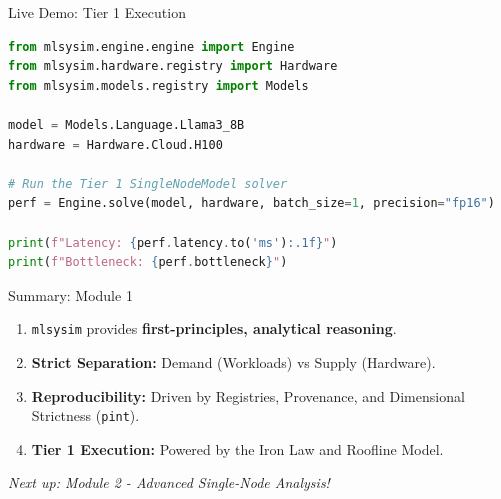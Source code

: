 \documentclass[aspectratio=169, 12pt]{beamer}
\newcommand{\mlsysim}{\texttt{mlsysim}}
\begin{document}
\begin{frame}[fragile]{Live Demo: Tier 1 Execution}
\begin{lstlisting}[language=Python]
from mlsysim.engine.engine import Engine
from mlsysim.hardware.registry import Hardware
from mlsysim.models.registry import Models

model = Models.Language.Llama3_8B
hardware = Hardware.Cloud.H100

# Run the Tier 1 SingleNodeModel solver
perf = Engine.solve(model, hardware, batch_size=1, precision="fp16")

print(f"Latency: {perf.latency.to('ms'):.1f}")
print(f"Bottleneck: {perf.bottleneck}")
\end{lstlisting}
\end{frame}

\begin{frame}{Summary: Module 1}
\begin{enumerate}
  \item \mlsysim{} provides \textbf{first-principles, analytical reasoning}.
  \item \textbf{Strict Separation:} Demand (Workloads) vs Supply (Hardware).
  \item \textbf{Reproducibility:} Driven by Registries, Provenance, and Dimensional Strictness (\texttt{pint}).
  \item \textbf{Tier 1 Execution:} Powered by the Iron Law and Roofline Model.
\end{enumerate}
\vspace{1em}
\begin{center}
\textit{Next up: Module 2 - Advanced Single-Node Analysis!}
\end{center}
\end{frame}
\end{document}
